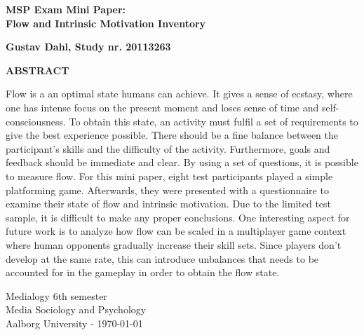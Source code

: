 \thispagestyle{empty} %
\hspace{6cm} \vspace{0.1cm}
\begin{center}
\textbf{\huge {MSP Exam Mini Paper:\\Flow and Intrinsic Motivation Inventory}}\\ \vspace{1cm}

\Large{\textbf{Gustav Dahl, Study nr. 20113263}}

\textbf{ABSTRACT}

Flow is a an optimal state humans can achieve. It gives a sense of ecstasy, where one has intense focus on the present moment and loses sense of time and self-consciousness. To obtain this state, an activity must fulfil a set of requirements to give the best experience possible. There should be a fine balance between the participant's skills and the difficulty of the activity. Furthermore, goals and feedback should be immediate and clear. By using a set of questions, it is possible to measure flow. For this mini paper, eight test participants played a simple platforming game. Afterwards, they were presented with a questionnaire to examine their state of flow and intrinsic motivation. Due to the limited test sample, it is difficult to make any proper conclusions. One interesting aspect for future work is to analyze how flow can be scaled in a multiplayer game context where human opponents gradually increase their skill sets. Since players don't develop at the same rate, this can introduce unbalances that needs to be accounted for in the gameplay in order to obtain the flow state.

\end{center}
\vfill
Medialogy 6th semester\\
Media Sociology and Psychology\\
Aalborg University - \today